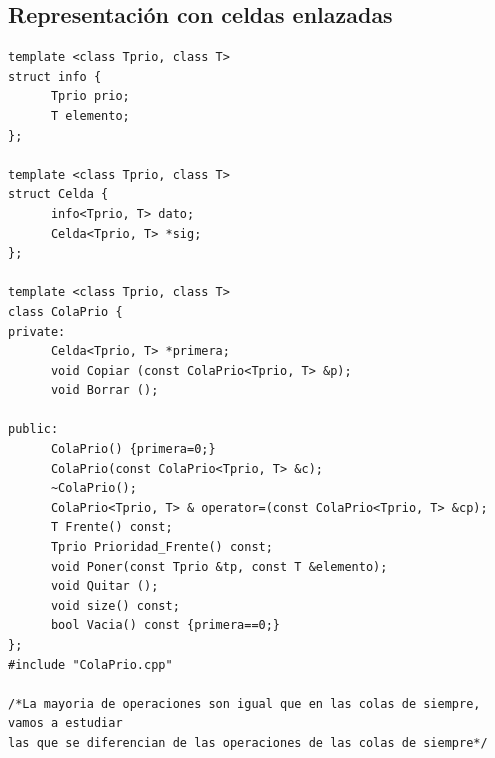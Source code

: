 \documentclass[10pt,a4paper,spanish]{report}
\begin{document}
\subsection{\textcolor[rgb]{0.2,0.5,0.5}Representación con celdas enlazadas}
\begin{verbatim}
template <class Tprio, class T>
struct info {
      Tprio prio;
      T elemento;
};

template <class Tprio, class T>
struct Celda {
      info<Tprio, T> dato;
      Celda<Tprio, T> *sig;
};

template <class Tprio, class T>
class ColaPrio {
private:
      Celda<Tprio, T> *primera;
      void Copiar (const ColaPrio<Tprio, T> &p);
      void Borrar ();

public:
      ColaPrio() {primera=0;}
      ColaPrio(const ColaPrio<Tprio, T> &c);
      ~ColaPrio();
      ColaPrio<Tprio, T> & operator=(const ColaPrio<Tprio, T> &cp);
      T Frente() const;
      Tprio Prioridad_Frente() const;
      void Poner(const Tprio &tp, const T &elemento);
      void Quitar ();
      void size() const;
      bool Vacia() const {primera==0;}
};
#include "ColaPrio.cpp"

/*La mayoria de operaciones son igual que en las colas de siempre, vamos a estudiar
las que se diferencian de las operaciones de las colas de siempre*/
\end{verbatim}
\end{document}
